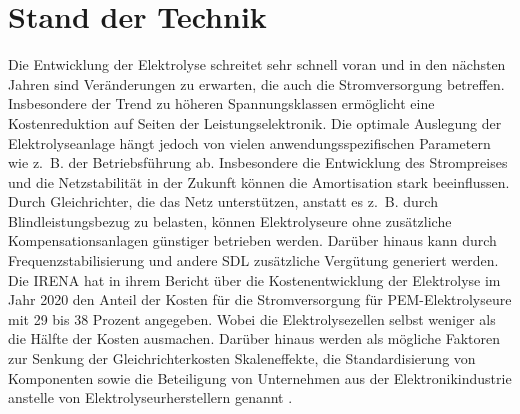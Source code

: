 \section{Stand der Technik}
Die Entwicklung der Elektrolyse schreitet sehr schnell voran und in den nächsten Jahren sind Veränderungen zu erwarten, die auch die Stromversorgung betreffen. Insbesondere der Trend zu höheren Spannungsklassen ermöglicht eine Kostenreduktion auf Seiten der Leistungselektronik. Die optimale Auslegung der Elektrolyseanlage hängt jedoch von vielen anwendungsspezifischen Parametern wie z.~B. der Betriebsführung ab. Insbesondere die Entwicklung des Strompreises und die Netzstabilität in der Zukunft können die Amortisation stark beeinflussen. Durch Gleichrichter, die das Netz unterstützen, anstatt es z.~B. durch Blindleistungsbezug zu belasten, können Elektrolyseure ohne zusätzliche Kompensationsanlagen günstiger betrieben werden. Darüber hinaus kann durch Frequenzstabilisierung und andere \gls{SDL} zusätzliche Vergütung generiert werden. \\
Die \gls{IRENA} hat in ihrem Bericht über die Kostenentwicklung der Elektrolyse im Jahr 2020 den Anteil der Kosten für die Stromversorgung für \gls{PEM}-Elektrolyseure mit 29 bis 38 Prozent angegeben. Wobei die Elektrolysezellen selbst weniger als die Hälfte der Kosten ausmachen. Darüber hinaus werden als mögliche Faktoren zur Senkung der Gleichrichterkosten Skaleneffekte, die Standardisierung von Komponenten sowie die Beteiligung von Unternehmen aus der Elektronikindustrie anstelle von Elektrolyseurherstellern genannt \cite{IRENA2020}. 
